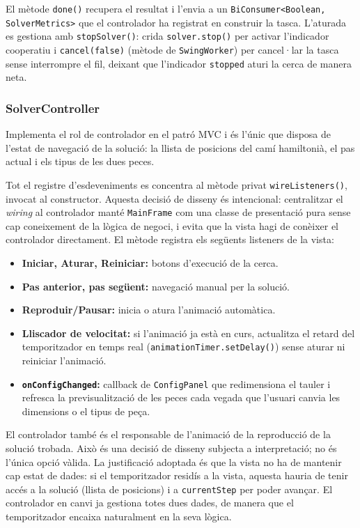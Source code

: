 \documentclass[conference,compsoc]{IEEEtran}
\begin{document}
El mètode \texttt{done()} recupera el resultat i l'envia a un
\texttt{BiConsumer<Boolean, SolverMetrics>} que el controlador ha
registrat en construir la tasca. L'aturada es gestiona amb
\texttt{stopSolver()}: crida \texttt{solver.stop()} per activar
l'indicador cooperatiu i \texttt{cancel(false)} (mètode de \texttt{SwingWorker}) per cancel·lar la
tasca sense interrompre el fil, deixant que l'indicador
\texttt{stopped} aturi la cerca de manera neta.

\subsubsection{SolverController}

Implementa el rol de controlador en el patró MVC i és l'únic que disposa
de l'estat de navegació de la solució: la llista de posicions del camí
hamiltonià, el pas actual i els tipus de les dues peces.

Tot el registre d'esdeveniments es concentra al mètode privat
\texttt{wireListeners()}, invocat al constructor. Aquesta decisió de
disseny és intencional: centralitzar el \textit{wiring} al controlador
manté \texttt{MainFrame} com una classe de presentació pura sense cap
coneixement de la lògica de negoci, i evita que la vista hagi de
conèixer el controlador directament. El mètode registra els següents
listeners de la vista:

\begin{itemize}
    \item \textbf{Iniciar, Aturar, Reiniciar:} botons d'execució de la cerca.
    \item \textbf{Pas anterior, pas següent:} navegació manual per la solució.
    \item \textbf{Reproduir/Pausar:} inicia o atura l'animació automàtica.
    \item \textbf{Lliscador de velocitat:} si l'animació ja està en curs,
          actualitza el retard del temporitzador en temps real
          (\texttt{animationTimer.setDelay()}) sense aturar ni reiniciar
          l'animació.
    \item \textbf{\texttt{onConfigChanged}:} callback de \texttt{ConfigPanel}
          que redimensiona el tauler i refresca la previsualització de les
          peces cada vegada que l'usuari canvia les dimensions o el tipus
          de peça.
\end{itemize}

El controlador també és el responsable de l'animació de la reproducció de
la solució trobada. Això és una decisió de disseny
subjecta a interpretació; no és l'única opció vàlida. La justificació
adoptada és que la vista no ha de mantenir cap estat de dades: si el
temporitzador residís a la vista, aquesta hauria de tenir accés a la
solució (llista de posicions) i a \texttt{currentStep} per poder
avançar. El controlador en canvi ja gestiona totes dues dades, de
manera que el temporitzador encaixa naturalment en la seva lògica.
\end{document}
